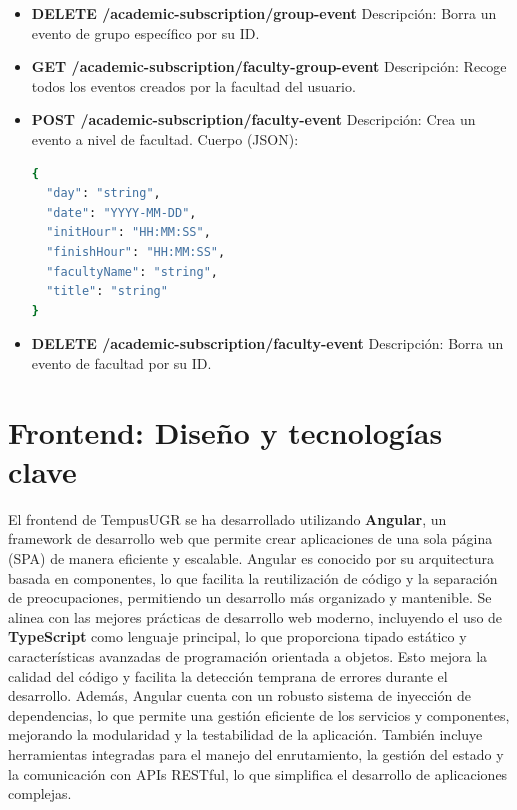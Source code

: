 \begin{itemize}
\begin{itemize}
        \item \textbf{DELETE /academic-subscription/group-event}
        \newline Descripción: Borra un evento de grupo específico por su ID.

        \item \textbf{GET /academic-subscription/faculty-group-event}
        \newline Descripción: Recoge todos los eventos creados por la facultad del usuario.

        \item \textbf{POST /academic-subscription/faculty-event}
        \newline Descripción: Crea un evento a nivel de facultad.
        \newline Cuerpo (JSON):
\begin{lstlisting}[language=bash]
{
  "day": "string",
  "date": "YYYY-MM-DD",
  "initHour": "HH:MM:SS",
  "finishHour": "HH:MM:SS",
  "facultyName": "string",
  "title": "string"
}
\end{lstlisting}

        \item \textbf{DELETE /academic-subscription/faculty-event}
        \newline Descripción: Borra un evento de facultad por su ID.
    \end{itemize}
\end{itemize}

\section{Frontend: Diseño y tecnologías clave} 

El frontend de TempusUGR se ha desarrollado utilizando \textbf{Angular}, un framework de desarrollo web que permite crear aplicaciones de una sola página (SPA) de manera eficiente y escalable. Angular es conocido por su arquitectura basada en componentes, lo que facilita la reutilización de código y la separación de preocupaciones, permitiendo un desarrollo más organizado y mantenible.
\newline\newline
Se alinea con las mejores prácticas de desarrollo web moderno, incluyendo el uso de \textbf{TypeScript} como lenguaje principal, lo que proporciona tipado estático y características avanzadas de programación orientada a objetos. Esto mejora la calidad del código y facilita la detección temprana de errores durante el desarrollo.
\newline\newline
Además, Angular cuenta con un robusto sistema de inyección de dependencias, lo que permite una gestión eficiente de los servicios y componentes, mejorando la modularidad y la testabilidad de la aplicación. También incluye herramientas integradas para el manejo del enrutamiento, la gestión del estado y la comunicación con APIs RESTful, lo que simplifica el desarrollo de aplicaciones complejas.

